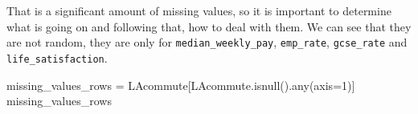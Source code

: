 \documentclass[
  number]{elsarticle}
\newenvironment{Shaded}{\begin{snugshade}}{\end{snugshade}}
\newcommand{\BuiltInTok}[1]{\textcolor[rgb]{0.00,0.23,0.31}{#1}}
\newcommand{\DecValTok}[1]{\textcolor[rgb]{0.68,0.00,0.00}{#1}}
\newcommand{\NormalTok}[1]{\textcolor[rgb]{0.00,0.23,0.31}{#1}}
\newcommand{\OperatorTok}[1]{\textcolor[rgb]{0.37,0.37,0.37}{#1}}
\begin{document}
That is a significant amount of missing values, so it is important to
determine what is going on and following that, how to deal with them. We
can see that they are not random, they are only for
\texttt{\textquotesingle{}median\_weekly\_pay\textquotesingle{}},
\texttt{\textquotesingle{}emp\_rate\textquotesingle{}},
\texttt{\textquotesingle{}gcse\_rate\textquotesingle{}} and
\texttt{\textquotesingle{}life\_satisfaction\textquotesingle{}}.

\begin{Shaded}
\begin{Highlighting}[]
\NormalTok{missing\_values\_rows }\OperatorTok{=}\NormalTok{ LAcommute[LAcommute.isnull().}\BuiltInTok{any}\NormalTok{(axis}\OperatorTok{=}\DecValTok{1}\NormalTok{)]}
\NormalTok{missing\_values\_rows}
\end{Highlighting}
\end{Shaded}
\end{document}
